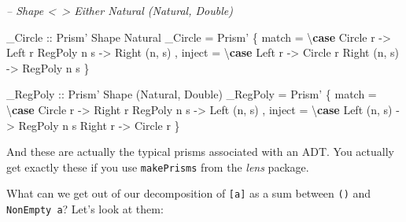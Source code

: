 \documentclass[]{article}
\newenvironment{Shaded}{}{}
\newcommand{\CommentTok}[1]{\textcolor[rgb]{0.38,0.63,0.69}{\textit{#1}}}
\newcommand{\DataTypeTok}[1]{\textcolor[rgb]{0.56,0.13,0.00}{#1}}
\newcommand{\FunctionTok}[1]{\textcolor[rgb]{0.02,0.16,0.49}{#1}}
\newcommand{\KeywordTok}[1]{\textcolor[rgb]{0.00,0.44,0.13}{\textbf{#1}}}
\newcommand{\NormalTok}[1]{#1}
\newcommand{\OtherTok}[1]{\textcolor[rgb]{0.00,0.44,0.13}{#1}}
\begin{document}
\begin{Shaded}
\begin{Highlighting}[]
\CommentTok{-- Shape <~> Either Natural (Natural, Double)}

\OtherTok{_Circle ::} \DataTypeTok{Prism'} \DataTypeTok{Shape} \DataTypeTok{Natural}
\NormalTok{_Circle }\FunctionTok{=} \DataTypeTok{Prism'}\NormalTok{ \{ match  }\FunctionTok{=}\NormalTok{ \textbackslash{}}\KeywordTok{case} \DataTypeTok{Circle}\NormalTok{  r    }\OtherTok{->} \DataTypeTok{Left}\NormalTok{ r}
                                  \DataTypeTok{RegPoly}\NormalTok{ n s  }\OtherTok{->} \DataTypeTok{Right}\NormalTok{ (n, s)}
\NormalTok{                 , inject }\FunctionTok{=}\NormalTok{ \textbackslash{}}\KeywordTok{case} \DataTypeTok{Left}\NormalTok{   r     }\OtherTok{->} \DataTypeTok{Circle}\NormalTok{ r}
                                  \DataTypeTok{Right}\NormalTok{ (n, s) }\OtherTok{->} \DataTypeTok{RegPoly}\NormalTok{ n s}
\NormalTok{                 \}}

\OtherTok{_RegPoly ::} \DataTypeTok{Prism'} \DataTypeTok{Shape}\NormalTok{ (}\DataTypeTok{Natural}\NormalTok{, }\DataTypeTok{Double}\NormalTok{)}
\NormalTok{_RegPoly }\FunctionTok{=} \DataTypeTok{Prism'}\NormalTok{ \{ match  }\FunctionTok{=}\NormalTok{ \textbackslash{}}\KeywordTok{case} \DataTypeTok{Circle}\NormalTok{  r    }\OtherTok{->} \DataTypeTok{Right}\NormalTok{ r}
                                   \DataTypeTok{RegPoly}\NormalTok{ n s  }\OtherTok{->} \DataTypeTok{Left}\NormalTok{ (n, s)}
\NormalTok{                  , inject }\FunctionTok{=}\NormalTok{ \textbackslash{}}\KeywordTok{case} \DataTypeTok{Left}\NormalTok{  (n, s) }\OtherTok{->} \DataTypeTok{RegPoly}\NormalTok{ n s}
                                   \DataTypeTok{Right}\NormalTok{  r     }\OtherTok{->} \DataTypeTok{Circle}\NormalTok{ r}
\NormalTok{                  \}}
\end{Highlighting}
\end{Shaded}

And these are actually the typical prisms associated with an ADT. You actually
get exactly these if you use \texttt{makePrisms} from the \emph{lens} package.

What can we get out of our decomposition of \texttt{{[}a{]}} as a sum between
\texttt{()} and \texttt{NonEmpty\ a}? Let's look at them:
\end{document}
